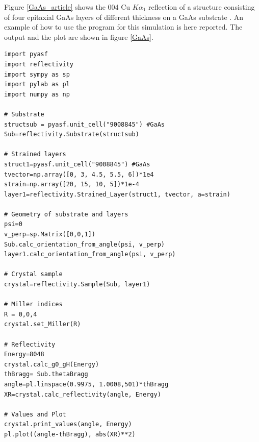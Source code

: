 \documentclass[12pt,oneside,notitlepage,abstracton,a4paper]{scrartcl}
\begin{document}
Figure \ref{GaAs_article} shows the 004 Cu $K\alpha_1$ reflection of a structure consisting of four epitaxial GaAs layers of different thickness on a GaAs substrate \cite{Bartels:a25435}. An example of how to use the program for this simulation is here reported. The output and the plot are shown in figure \ref{GaAs}.

\newpage
\begin{lstlisting}
import pyasf
import reflectivity
import sympy as sp
import pylab as pl
import numpy as np

# Substrate
structsub = pyasf.unit_cell("9008845") #GaAs
Sub=reflectivity.Substrate(structsub)

# Strained layers
struct1=pyasf.unit_cell("9008845") #GaAs
tvector=np.array([0, 3, 4.5, 5.5, 6])*1e4
strain=np.array([20, 15, 10, 5])*1e-4
layer1=reflectivity.Strained_Layer(struct1, tvector, a=strain)

# Geometry of substrate and layers
psi=0
v_perp=sp.Matrix([0,0,1])
Sub.calc_orientation_from_angle(psi, v_perp)
layer1.calc_orientation_from_angle(psi, v_perp)

# Crystal sample    
crystal=reflectivity.Sample(Sub, layer1)

# Miller indices
R = 0,0,4
crystal.set_Miller(R)

# Reflectivity
Energy=8048
crystal.calc_g0_gH(Energy)
thBragg= Sub.thetaBragg
angle=pl.linspace(0.9975, 1.0008,501)*thBragg
XR=crystal.calc_reflectivity(angle, Energy)

# Values and Plot
crystal.print_values(angle, Energy)
pl.plot((angle-thBragg), abs(XR)**2)
\end{lstlisting}
\end{document}
